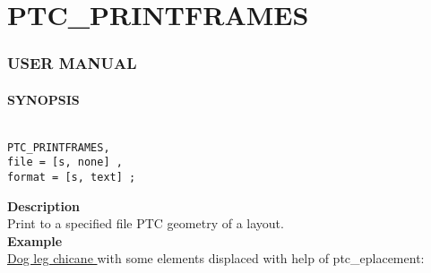 


\section{PTC\_PRINTFRAMES}





\subsubsection{   USER MANUAL   }


\paragraph{SYNOPSIS}
\begin{verbatim}

PTC_PRINTFRAMES, 
file = [s, none] ,
format = [s, text] ; 

\end{verbatim}


\textbf{ Description }\\

  Print to a specified file PTC geometry of a layout.   \\

\textbf{ Example }\\

\href{http://cern.ch/frs/mad-X_examples/ptc_madx_interface/eplacement/eplacement.madx}{   Dog leg chicane } with some elements displaced with help of ptc\_eplacement:   

